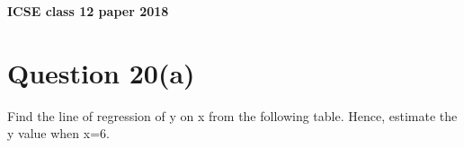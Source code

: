 \documentclass[journal,12pt,twocolumn]{IEEEtran}
\begin{document}
\let\StandardTheFigure\thefigure
\let\vec\mathbf
\renewcommand{\thefigure}{\theproblem}
	
	
	
	\def\putbox#1#2#3{\makebox[0in][l]{\makebox[#1][l]{}\raisebox{\baselineskip}[0in][0in]{\raisebox{#2}[0in][0in]{#3}}}}
	\def\rightbox#1{\makebox[0in][r]{#1}}
	\def\centbox#1{\makebox[0in]{#1}}
	\def\topbox#1{\raisebox{-\baselineskip}[0in][0in]{#1}}
	\def\midbox#1{\raisebox{-0.5\baselineskip}[0in][0in]{#1}}
	
	\vspace{3cm}

	\textbf{ICSE class 12 paper 2018}
	\section{Question 20(a)} 
Find the line of regression of y on x from the following table.
Hence, estimate the y value when x=6.
\begin{table}[!htb]
	\centering
	
	\caption{}
	\label{table:Table}
\end{table} 
\end{document}

